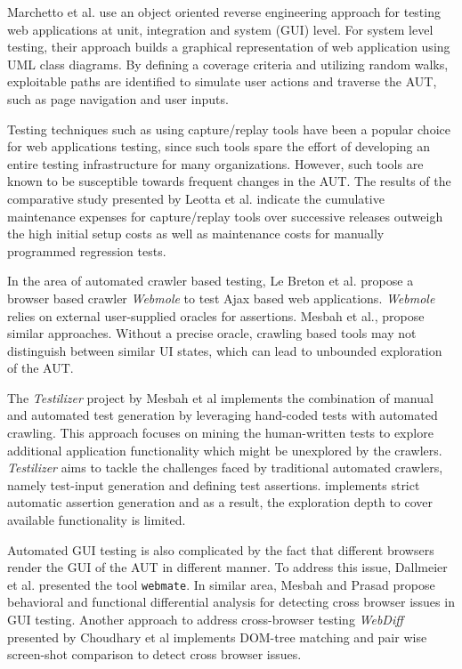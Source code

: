 Marchetto et al.\cite{Marchetto2006} use an object oriented reverse engineering approach for testing web applications at unit, integration and system (GUI) level. For system level testing, their approach builds a graphical representation of web application using UML class diagrams. By defining a coverage criteria and utilizing random walks, exploitable paths are identified to simulate user actions and traverse the AUT, such as page navigation and user inputs.

Testing techniques such as using capture/replay tools have been a popular choice for web applications testing, since such tools spare the effort of developing an entire testing infrastructure for many organizations. However, such tools are known to be susceptible towards frequent changes in the AUT\cite{sjosten2006costs}. The results of the comparative study presented by Leotta et al.\cite{leotta2013capture} indicate the cumulative maintenance expenses for capture/replay tools over successive releases outweigh the high initial setup costs as well as maintenance costs for manually programmed regression tests. 

In the area of automated crawler based testing, Le Breton et al. \cite{le2013automated} propose a browser based crawler \textit{Webmole} to test Ajax based web applications. \textit{Webmole} relies on external user-supplied oracles for assertions. Mesbah et al.\cite{Crawljax},\cite{MesbahInvarient} propose similar approaches. Without a precise oracle, crawling based tools may not distinguish between similar UI states, which can lead to unbounded exploration of the AUT.

The \textit{Testilizer} project by Mesbah et al \cite{testilizer} implements the combination of manual and automated test generation by leveraging hand-coded tests with automated crawling. This approach focuses on mining the human-written tests to explore additional application functionality which might be unexplored by the crawlers. \textit{Testilizer} aims to tackle the challenges faced by traditional automated crawlers, namely test-input generation and defining test assertions. implements strict automatic assertion generation and as a result, the exploration depth to cover available functionality is limited.

Automated GUI testing is also complicated by the fact that different browsers render the GUI of the AUT in different manner. To address this issue, Dallmeier et al. presented the tool \texttt{webmate}. In similar area, Mesbah and Prasad\cite{CBCMesbah} propose behavioral and functional differential analysis for detecting cross browser issues in GUI testing. Another approach to address cross-browser testing \textit{WebDiff} presented by Choudhary et al \cite{WebDiff} implements DOM-tree matching and pair wise screen-shot comparison to detect cross browser issues. 

